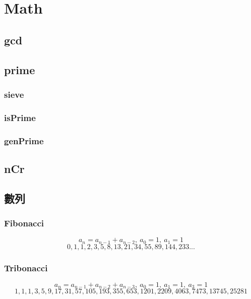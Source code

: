 \section{Math}

\subsection{gcd}


\subsection{prime}
\subsubsection{sieve}


\subsubsection{isPrime}


\subsubsection{genPrime}


% 

\subsection{nCr}


\subsection{數列}
\subsubsection{Fibonacci}
\[a_{n} = a_{n-1} + a_{n-2},\ a_0 = 1,\ a_1 = 1\]
\[0, 1, 1, 2, 3, 5, 8, 13, 21, 34, 55, 89, 144, 233...\]

\subsubsection{Tribonacci}
\[a_{n} = a_{n-1} + a_{n-2} + a_{n-3},\ a_0 = 1,\ a_1 = 1,\ a_3 = 1\]
\[1, 1, 1, 3, 5, 9, 17, 31, 57, 105, 193, 355, 653, 1201, 2209, 4063, 7473, 13745, 25281\]


